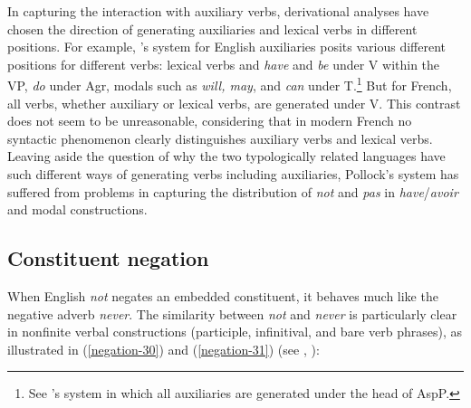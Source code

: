 \documentclass[output=paper
                ,modfonts
                ,nonflat
	        ,collection
	        ,collectionchapter
	        ,collectiontoclongg
 	        ,biblatex
                ,babelshorthands
                ,newtxmath
                ,draftmode
                ,colorlinks, citecolor=brown
]{./langsci/langscibook}
\begin{document}
{\begin{exe}
\begin{xlist}
\begin{exe}
\begin{xlist}
{In capturing the interaction with auxiliary verbs, derivational analyses have chosen the direction of generating
auxiliaries and lexical  verbs in different positions. For example,
\citet{Pollock:89}'s system for English auxiliaries posits
various different positions for different verbs: lexical
verbs and \textit{have} and \textit{be} under V within the VP,
\textit{do} under Agr, modals such as \textit{will, may}, and \textit{can}
under T.\footnote{See \citep{Ouhalla:91}'s system in which
all auxiliaries are generated under the head of AspP.} But for French,
all verbs, whether
auxiliary or lexical  verbs, are generated under V.
This contrast does not seem to be unreasonable, considering that in
modern French no syntactic phenomenon clearly distinguishes auxiliary
verbs and lexical  verbs. Leaving aside the question of why the two
typologically related languages have such different ways of generating
verbs including auxiliaries, Pollock's system has suffered
from problems in capturing the distribution of \textit{not} and
\textit{pas} in \textit{have}/\textit{avoir} and modal constructions.}
\fi

\subsection{Constituent negation}

When English \textit{not} negates an embedded constituent, it behaves
much like the negative adverb \textit{never}. The similarity between {\it
not} and \textit{never} is particularly clear in nonfinite verbal
constructions (participle, infinitival, and bare verb phrases), as
illustrated in (\ref{negation-30}) and (\ref{negation-31}) (see \citealt{Klima:64,Kim:00},
\citealt[]{kimmichaelis:2020}):

\eal\label{negation-30}
\zl


\end{xlist}
\end{exe}
\end{xlist}
\end{exe}}
\end{document}
